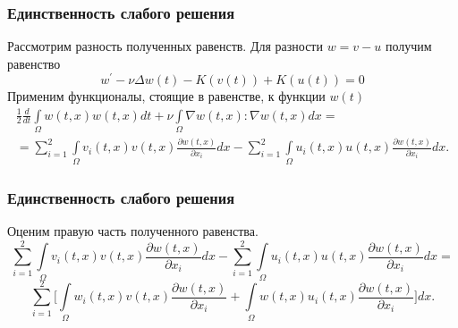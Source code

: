 \documentclass[10pt, pdf, hyperref={unicode}]{beamer}
\begin{document}
    \begin{frame}
    \frametitle{Единственность слабого решения}
    \begin{center}
      \begin{minipage}[h]{0.97\linewidth}
        Рассмотрим разность полученных равенств. 
    Для разности $w = v - u$ получим равенство
    $$w^\prime - \nu\Delta w(t) - K(v(t)) + K(u(t)) = 0$$
    Применим функционалы, стоящие в равенстве, к функции $w(t)$
    \begin{equation}\label{eq:5.36}
        \begin{gathered}
            \frac{1}{2}\frac{d}{dt}\int\limits_\Omega w(t, x)w(t, x)dt+\nu\int\limits_{\Omega} \nabla w(t,x):\nabla w(t,x)dx= \\
            =\sum_{i=1}^{2}\int\limits_\Omega v_i(t,x) v(t, x)\frac{\partial w(t, x)}{\partial x_i}dx-\sum_{i=1}^{2}\int\limits_\Omega u_i(t,x)u(t, x)\frac{\partial w(t, x)}{\partial x_i}dx.
        \end{gathered}
    \end{equation}
      \end{minipage}
    \end{center}
  \end{frame}

    \begin{frame}
    \frametitle{Единственность слабого решения}
    \begin{center}
      \begin{minipage}[h]{0.97\linewidth}
        Оценим правую часть полученного равенства.
        $$\sum_{i=1}^{2}\int\limits_\Omega v_i(t,x) v(t, x)\frac{\partial w(t, x)}{\partial x_i}dx-
        \sum_{i=1}^{2}\int\limits_\Omega u_i(t,x)u(t, x)\frac{\partial w(t, x)}{\partial x_i}dx=$$
        $$\sum_{i=1}^{2}\bigg[\int\limits_\Omega w_i(t,x)v(t,x)\frac{\partial w(t, x)}{\partial x_i}
        +\int\limits_\Omega w(t,x)u_i(t,x)\frac{\partial w(t, x)}{\partial x_i}\bigg]dx.$$
      \end{minipage}
    \end{center}
  \end{frame}
\end{document}
